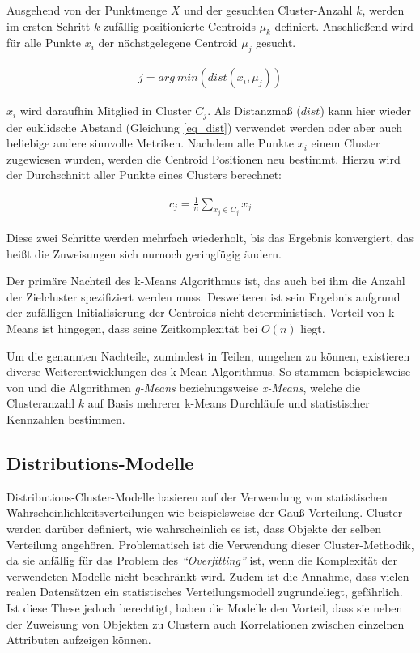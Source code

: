 Ausgehend von der Punktmenge $X$ und der gesuchten Cluster-Anzahl $k$,
werden im ersten Schritt $k$ zufällig positionierte Centroids $\mu_k$ definiert.
Anschließend wird für alle Punkte $x_i$ der nächstgelegene Centroid $\mu_j$ gesucht.

\begin{ceqn}
\begin{align}
    \label{eq_kmeans2}
    j = arg\ min(dist(x_i, \mu_j))
\end{align}
\end{ceqn}

$x_i$ wird daraufhin Mitglied in Cluster $C_j$. Als Distanzmaß ($dist$) kann hier wieder der euklidsche Abstand
(Gleichung \ref{eq_dist}) verwendet werden oder aber auch beliebige andere sinnvolle Metriken.
Nachdem alle Punkte $x_i$ einem Cluster zugewiesen wurden, werden die Centroid Positionen neu bestimmt.
Hierzu wird der Durchschnitt aller Punkte eines Clusters berechnet:

\begin{ceqn}
\begin{align}
    \label{eq_kmeans3}
    c_j = \frac{1}{n} \sum_{x_j \in C_j} x_j
\end{align}
\end{ceqn}

Diese zwei Schritte werden mehrfach wiederholt, bis das Ergebnis konvergiert, das heißt die Zuweisungen sich
nurnoch geringfügig ändern. \cite[]{Jain2010}

Der primäre Nachteil des k-Means Algorithmus ist, das auch bei ihm die Anzahl der Zielcluster spezifiziert
werden muss. Desweiteren ist sein Ergebnis aufgrund der zufälligen Initialisierung der Centroids
nicht deterministisch. Vorteil von k-Means ist hingegen, dass seine Zeitkomplexität bei $O(n)$ liegt.

Um die genannten Nachteile, zumindest in Teilen, umgehen zu können, existieren diverse Weiterentwicklungen des k-Mean
Algorithmus. So stammen beispielsweise von \cite[]{Hamerly} und \cite[]{Pelleg} die Algorithmen \textit{g-Means}
beziehungsweise \textit{x-Means}, welche die Clusteranzahl $k$ auf Basis mehrerer k-Means Durchläufe und
statistischer Kennzahlen bestimmen.

\subsection{Distributions-Modelle}
\label{sec:grund_distribution_clustering}

Distributions-Cluster-Modelle basieren auf der Verwendung von statistischen Wahrscheinlichkeitsverteilungen wie
beispielsweise der Gauß-Verteilung. Cluster werden darüber definiert, wie wahrscheinlich es ist, dass Objekte
der selben Verteilung angehören. Problematisch ist die Verwendung dieser Cluster-Methodik, da sie anfällig für
das Problem des \textit{``Overfitting''} ist, wenn die Komplexität der verwendeten Modelle nicht beschränkt wird.
Zudem ist die Annahme, dass vielen realen Datensätzen ein statistisches Verteilungsmodell zugrundeliegt, gefährlich.
Ist diese These jedoch berechtigt, haben die Modelle den Vorteil, dass sie neben der Zuweisung von Objekten zu Clustern
auch Korrelationen zwischen einzelnen Attributen aufzeigen können. \cite[]{AndersDrachen2014}

